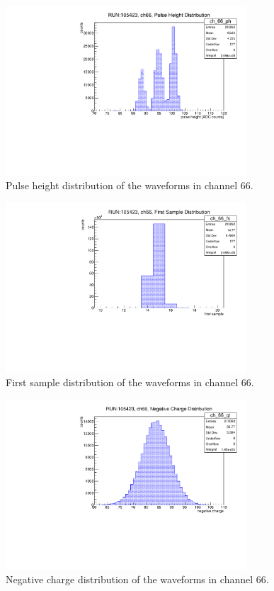 \begin{figure}[!h]
  \centering
  \includegraphics[width=0.8\textwidth]{figures/pdf/pulseheight.pdf}
  \caption{Pulse height distribution of the waveforms in channel 66.}
  \label{fig:ph2}
\end{figure}

\begin{figure}[!h]
  \centering
  \includegraphics[width=0.8\textwidth]{figures/pdf/fs.pdf}
  \caption{First sample distribution of the waveforms in channel 66.}
  \label{fig:fs2}
\end{figure}

\begin{figure}[!h]
    \centering
    \includegraphics[width=0.8\textwidth]{figures/pdf/negcharge.pdf}
    \caption{Negative charge distribution of the waveforms in channel 66.}
    \label{fig:nch2}
\end{figure}
    
